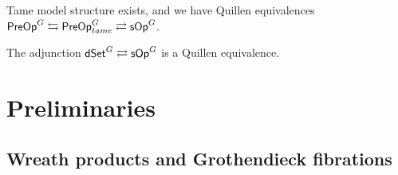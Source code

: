 \documentclass[a4paper,10pt
,draft
]{article}%
\renewcommand{\1}{\eta}%
\begin{document}



\begin{theorem}
      Tame model structure exists, and we have Quillen equivalences
      $\mathsf{PreOp}^G \leftrightarrows \mathsf{PreOp}^G_{tame} \rightleftarrows \mathsf{sOp}^G$.
\end{theorem}

\begin{theorem}
      \label{QE_THM}
      The adjunction $\mathsf{dSet}^G \rightleftarrows \mathsf{sOp}^G$ is a Quillen equivalence.
\end{theorem}

\section{Preliminaries}

\subsection{Wreath products and Grothendieck fibrations}

\end{document}

